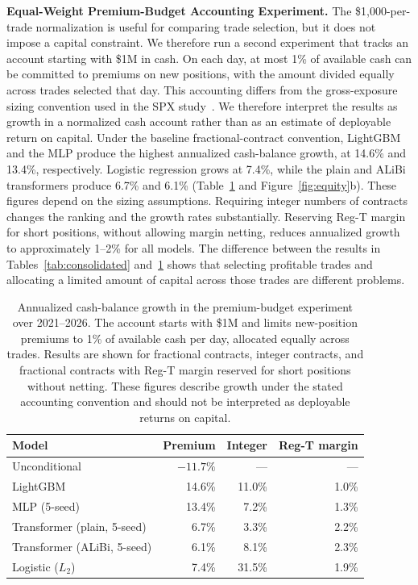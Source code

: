 \documentclass[sigconf,review,anonymous]{acmart}
\begin{document}
\smallskip\noindent\textbf{Equal-Weight Premium-Budget Accounting Experiment.}
\label{sec:capitalscaled}
The \$1{,}000-per-trade normalization is useful for comparing trade selection, but it does not impose a capital constraint. We therefore run a second experiment that tracks an account starting with \$1M in cash. On each day, at most 1\% of available cash can be committed to premiums on new positions, with the amount divided equally across trades selected that day.
This accounting differs from the gross-exposure sizing convention used in the SPX study~\cite{glasserman2025tp2}. We therefore interpret the results as growth in a normalized cash account rather than as an estimate of deployable return on capital.
Under the baseline fractional-contract convention, LightGBM and the MLP produce the highest annualized cash-balance growth, at 14.6\% and 13.4\%, respectively. Logistic regression grows at 7.4\%, while the plain and ALiBi transformers produce 6.7\% and 6.1\% (Table~\ref{tab:capitalscaled} and Figure~\ref{fig:equity}b).
These figures depend on the sizing assumptions. Requiring integer numbers of contracts changes the ranking and the growth rates substantially. Reserving Reg-T margin for short positions, without allowing margin netting, reduces annualized growth to approximately 1--2\% for all models. The difference between the results in Tables~\ref{tab:consolidated} and~\ref{tab:capitalscaled} shows that selecting profitable trades and allocating a limited amount of capital across those trades are different problems.

\begin{table}[t]
\centering
\footnotesize
\begin{tabular}{lrrr}
\toprule
Model & Premium & Integer & Reg-T margin \\
\midrule
Unconditional & $-11.7\%$ & --- & --- \\
LightGBM & 14.6\% & 11.0\% & 1.0\% \\
MLP (5-seed) & 13.4\% & 7.2\% & 1.3\% \\
Transformer (plain, 5-seed) & 6.7\% & 3.3\% & 2.2\% \\
Transformer (ALiBi, 5-seed) & 6.1\% & 8.1\% & 2.3\% \\
Logistic ($L_2$) & 7.4\% & 31.5\% & 1.9\% \\
\bottomrule
\end{tabular}
\caption{Annualized cash-balance growth in the premium-budget experiment over 2021--2026. The account starts with \$1M and limits new-position premiums to 1\% of available cash per day, allocated equally across trades. Results are shown for fractional contracts, integer contracts, and fractional contracts with Reg-T margin reserved for short positions without netting. These figures describe growth under the stated accounting convention and should not be interpreted as deployable returns on capital.}
\label{tab:capitalscaled}
\end{table}
\end{document}
